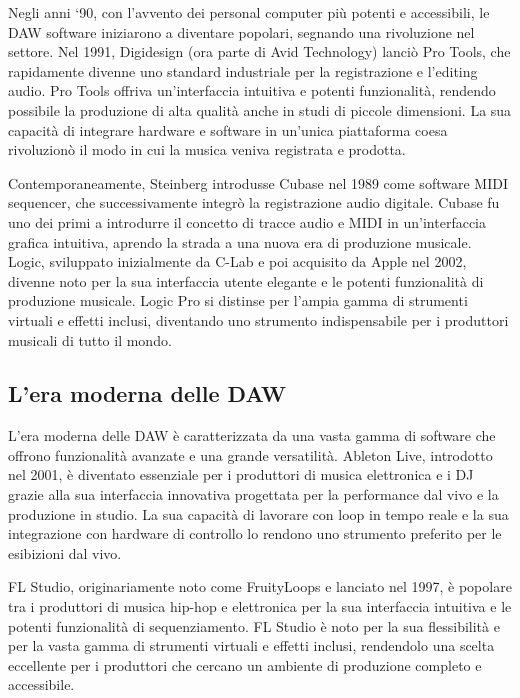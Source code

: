 \documentclass{book}
\begin{document}
Negli anni ‘90, con l’avvento dei personal computer più potenti e accessibili, le DAW software iniziarono a diventare popolari, segnando una rivoluzione nel settore. Nel 1991, Digidesign (ora parte di Avid Technology) lanciò Pro Tools, che rapidamente divenne uno standard industriale per la registrazione e l’editing audio. Pro Tools offriva un’interfaccia intuitiva e potenti funzionalità, rendendo possibile la produzione di alta qualità anche in studi di piccole dimensioni. La sua capacità di integrare hardware e software in un’unica piattaforma coesa rivoluzionò il modo in cui la musica veniva registrata e prodotta.

Contemporaneamente, Steinberg introdusse Cubase nel 1989 come software MIDI sequencer, che successivamente integrò la registrazione audio digitale. Cubase fu uno dei primi a introdurre il concetto di tracce audio e MIDI in un’interfaccia grafica intuitiva, aprendo la strada a una nuova era di produzione musicale. Logic, sviluppato inizialmente da C-Lab e poi acquisito da Apple nel 2002, divenne noto per la sua interfaccia utente elegante e le potenti funzionalità di produzione musicale. Logic Pro si distinse per l’ampia gamma di strumenti virtuali e effetti inclusi, diventando uno strumento indispensabile per i produttori musicali di tutto il mondo.

\subsection{L’era moderna delle DAW}

L’era moderna delle DAW è caratterizzata da una vasta gamma di software che offrono funzionalità avanzate e una grande versatilità. Ableton Live, introdotto nel 2001, è diventato essenziale per i produttori di musica elettronica e i DJ grazie alla sua interfaccia innovativa progettata per la performance dal vivo e la produzione in studio. La sua capacità di lavorare con loop in tempo reale e la sua integrazione con hardware di controllo lo rendono uno strumento preferito per le esibizioni dal vivo.

FL Studio, originariamente noto come FruityLoops e lanciato nel 1997, è popolare tra i produttori di musica hip-hop e elettronica per la sua interfaccia intuitiva e le potenti funzionalità di sequenziamento. FL Studio è noto per la sua flessibilità e per la vasta gamma di strumenti virtuali e effetti inclusi, rendendolo una scelta eccellente per i produttori che cercano un ambiente di produzione completo e accessibile.
\end{document}
